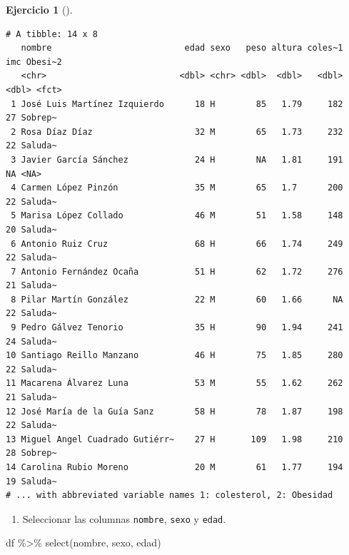 \documentclass[
  a4paper,
]{scrreport}
\newenvironment{Shaded}{\begin{snugshade}}{\end{snugshade}}
\newcommand{\FunctionTok}[1]{\textcolor[rgb]{0.28,0.35,0.67}{#1}}
\newcommand{\NormalTok}[1]{\textcolor[rgb]{0.00,0.23,0.31}{#1}}
\newcommand{\SpecialCharTok}[1]{\textcolor[rgb]{0.37,0.37,0.37}{#1}}
\providecommand{\tightlist}{%
  \setlength{\itemsep}{0pt}\setlength{\parskip}{0pt}}\usepackage{longtable,booktabs,array}
\theoremstyle{definition}
\newtheorem{exercise}{Ejercicio}[chapter]
\theoremstyle{remark}
\begin{document}
\begin{exercise}[]
\begin{tcolorbox}
\begin{verbatim}
# A tibble: 14 x 8
   nombre                          edad sexo   peso altura coles~1   imc Obesi~2
   <chr>                          <dbl> <chr> <dbl>  <dbl>   <dbl> <dbl> <fct>  
 1 José Luis Martínez Izquierdo      18 H        85   1.79     182    27 Sobrep~
 2 Rosa Díaz Díaz                    32 M        65   1.73     232    22 Saluda~
 3 Javier García Sánchez             24 H        NA   1.81     191    NA <NA>   
 4 Carmen López Pinzón               35 M        65   1.7      200    22 Saluda~
 5 Marisa López Collado              46 M        51   1.58     148    20 Saluda~
 6 Antonio Ruiz Cruz                 68 H        66   1.74     249    22 Saluda~
 7 Antonio Fernández Ocaña           51 H        62   1.72     276    21 Saluda~
 8 Pilar Martín González             22 M        60   1.66      NA    22 Saluda~
 9 Pedro Gálvez Tenorio              35 H        90   1.94     241    24 Saluda~
10 Santiago Reillo Manzano           46 H        75   1.85     280    22 Saluda~
11 Macarena Álvarez Luna             53 M        55   1.62     262    21 Saluda~
12 José María de la Guía Sanz        58 H        78   1.87     198    22 Saluda~
13 Miguel Angel Cuadrado Gutiérr~    27 H       109   1.98     210    28 Sobrep~
14 Carolina Rubio Moreno             20 M        61   1.77     194    19 Saluda~
# ... with abbreviated variable names 1: colesterol, 2: Obesidad
\end{verbatim}

\end{tcolorbox}

\begin{enumerate}
\def\labelenumi{\alph{enumi}.}
\setcounter{enumi}{3}
\tightlist
\item
  Seleccionar las columnas \texttt{nombre}, \texttt{sexo} y
  \texttt{edad}.
\end{enumerate}

\begin{tcolorbox}[enhanced jigsaw, rightrule=.15mm, toptitle=1mm, colbacktitle=quarto-callout-tip-color!10!white, titlerule=0mm, colback=white, leftrule=.75mm, bottomtitle=1mm, colframe=quarto-callout-tip-color-frame, breakable, title=\textcolor{quarto-callout-tip-color}{\faLightbulb}\hspace{0.5em}{Solución}, arc=.35mm, coltitle=black, opacityback=0, bottomrule=.15mm, opacitybacktitle=0.6, left=2mm, toprule=.15mm]

\begin{Shaded}
\begin{Highlighting}[]
\NormalTok{df }\SpecialCharTok{\%\textgreater{}\%}
    \FunctionTok{select}\NormalTok{(nombre, sexo, edad)}
\end{Highlighting}
\end{Shaded}


\end{tcolorbox}
\end{exercise}
\end{document}
